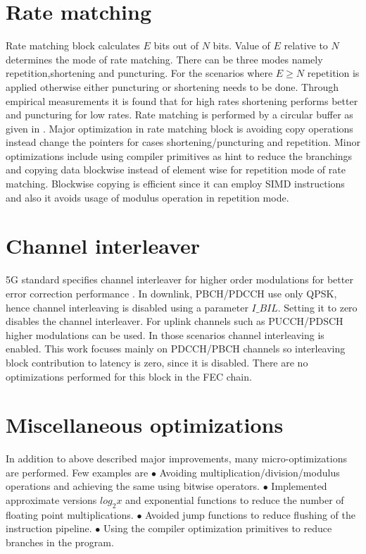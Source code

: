 \section{Rate matching}
Rate matching block calculates $E$ bits out of $N$ bits. Value of $E$ relative to $N$ determines the mode of rate matching. There can be three modes namely repetition,shortening and puncturing. For the scenarios where $E \geq N$ repetition is applied otherwise either puncturing or shortening needs to be done. Through empirical measurements it is found that for high rates shortening performs better and puncturing for low rates. Rate matching is performed by a circular buffer as given in \cite{DesignOfPolarCodes5G}. Major optimization in rate matching block is avoiding copy operations instead change the pointers for cases shortening/puncturing and repetition. Minor optimizations include using compiler primitives as hint to reduce the branchings and copying data blockwise instead of element wise for repetition mode of rate matching. Blockwise copying is efficient since it can employ SIMD instructions and also it avoids usage of modulus operation in repetition mode.

\section{Channel interleaver}
5G standard specifies channel interleaver for higher order modulations for better error correction performance \cite{3gpp.TSG-RAN_WG1}. In downlink, PBCH/PDCCH use only QPSK, hence channel interleaving is disabled using a parameter $I\_BIL$. Setting it to zero disables the channel interleaver. For uplink channels such as PUCCH/PDSCH higher modulations can be used. In those scenarios channel interleaving is enabled. This work focuses mainly on PDCCH/PBCH channels so interleaving block contribution to latency is zero, since it is disabled. There are no optimizations performed for this block in the FEC chain.

\section{Miscellaneous optimizations}
In addition to above described major improvements, many micro-optimizations are performed. Few examples are \newline
$\bullet $ Avoiding multiplication/division/modulus operations and achieving the same using bitwise operators.\newline
$\bullet $ Implemented approximate versions $log_{2}x$ and exponential functions to reduce the number of floating point multiplications.\newline
$\bullet $ Avoided jump functions to reduce flushing of the instruction pipeline.\newline
$\bullet $ Using the compiler optimization primitives to reduce branches in the program.\newline

